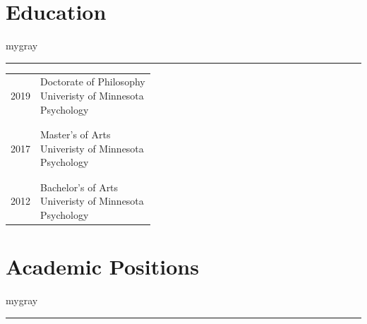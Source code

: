 \documentclass[
]{article}
\begin{document}
\vspace{1ex}

\hypertarget{education}{%
\section{\texorpdfstring{\textbf{Education}}{Education}}\label{education}}

\vspace{1ex}
\begin{color}{mygray}\hrule\end{color}
\vspace{1ex}

\begin{longtable}{p{2.25cm}p{5.5in}}
2019 & \parbox[t]{5.0in}{Doctorate of Philosophy \newline Univeristy of Minnesota \newline Psychology} \\\\& \\
2017 & \parbox[t]{5.0in}{Master's of Arts \newline Univeristy of Minnesota \newline Psychology} \\\\& \\
2012 & \parbox[t]{5.0in}{Bachelor's of Arts \newline Univeristy of Minnesota \newline Psychology} \\
\end{longtable}

\vspace{1ex}

\hypertarget{academic-positions}{%
\section{\texorpdfstring{\textbf{Academic
Positions}}{Academic Positions}}\label{academic-positions}}

\vspace{1ex}
\begin{color}{mygray}\hrule\end{color}
\vspace{1ex}
\end{document}
